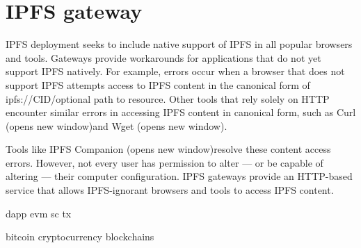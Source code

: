\section{IPFS gateway}

IPFS deployment seeks to include native support of IPFS in all popular browsers and tools. Gateways provide workarounds for applications that do not yet support IPFS natively. For example, errors occur when a browser that does not support IPFS attempts access to IPFS content in the canonical form of ipfs://{CID}/{optional path to resource}. Other tools that rely solely on HTTP encounter similar errors in accessing IPFS content in canonical form, such as Curl (opens new window)and Wget (opens new window).

Tools like IPFS Companion (opens new window)resolve these content access errors. However, not every user has permission to alter — or be capable of altering — their computer configuration. IPFS gateways provide an HTTP-based service that allows IPFS-ignorant browsers and tools to access IPFS content.

\acrlong{dapp}
\acrfull{evm}
\acrfull{sc}
\acrlong{tx}

\Gls{bitcoin}
\Gls{cryptocurrency}
\Glspl{blockchain}
